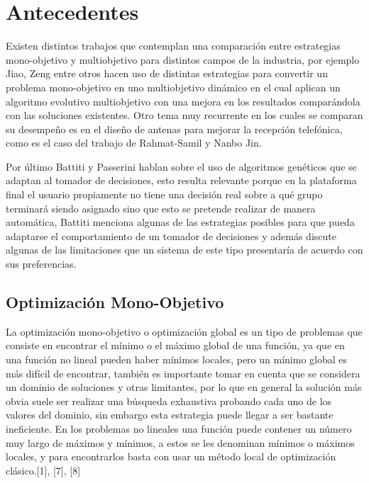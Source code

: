 \chapter{Antecedentes}
\label{chapter:chapter02}

Existen distintos trabajos que contemplan una comparación entre estrategias mono-objetivo y multiobjetivo para distintos campos de la industria, por ejemplo Jiao, Zeng\cite{Jiao2017DynamicME} entre otros hacen uso de distintas estrategias para convertir un problema mono-objetivo en uno multiobjetivo dinámico en el cual aplican un algoritmo evolutivo multiobjetivo con una mejora en los resultados comparándola con las soluciones existentes. Otro tema muy recurrente en los cuales se comparan su desempeño es en el diseño de antenas para mejorar la recepción telefónica, como es el caso del trabajo de Rahmat-Samil y Nanbo Jin.\cite{Jin2007-qu} 

Por último Battiti y Passerini\cite{Battiti2010-xo} hablan sobre el uso de algoritmos genéticos que se adaptan al tomador de decisiones, esto resulta relevante porque en la plataforma final el usuario propiamente no tiene una decisión real sobre a qué grupo terminará siendo asignado sino que esto se pretende realizar de manera automática, Battiti menciona algunas de las estrategias posibles para que pueda adaptarse el comportamiento de un tomador de decisiones y además discute algunas de las limitaciones que un sistema de este tipo presentaría de acuerdo con sus preferencias.\cite{Wang2010-zh} \\

\section{Optimización Mono-Objetivo}
La optimización mono-objetivo o optimización global es un tipo de problemas que consiste en encontrar el mínimo o el máximo global de una función, ya que en una función no lineal pueden haber mínimos locales, pero un mínimo global es más difícil de encontrar, también es importante tomar en cuenta que se considera un dominio de soluciones y otras limitantes, por lo que en general la solución más obvia suele ser realizar una búsqueda exhaustiva probando cada uno de los valores del dominio, sin embargo esta estrategia puede llegar a ser bastante ineficiente. En los problemas no lineales una función puede contener un número muy largo de máximos y mínimos, a estos se les denominan mínimos o máximos locales, y para encontrarlos basta con usar un método local de optimización clásico.[1], [7], [8] \\


